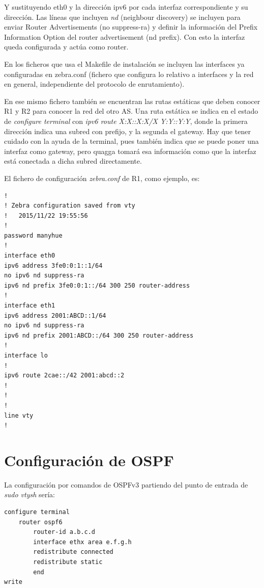 \documentclass{article}
\begin{document}
\hfil

Y sustituyendo eth0 y la dirección ipv6 por cada interfaz correspondiente y su dirección. Las líneas que incluyen \textit{nd} (neighbour discovery) se incluyen para enviar Router Advertisements (no suppress-ra) y definir la información del Prefix Information Option del router advertisement (nd prefix). Con esto la interfaz queda configurada y actúa como router.


En los ficheros que usa el Makefile de instalación se incluyen las interfaces ya configuradas en zebra.conf (fichero que configura lo relativo a interfaces y la red en general, independiente del protocolo de enrutamiento).

En ese mismo fichero también se encuentran las rutas estáticas que deben conocer R1 y R2 para conocer la red del otro AS. Una ruta estática se indica en el estado de \textit{configure terminal} con \textit{ipv6 route X:X::X:X/X  Y:Y::Y:Y}, donde la primera dirección indica una subred con prefijo, y la segunda el gateway. Hay que tener cuidado con la ayuda de la terminal, pues también indica que se puede poner una interfaz como gateway, pero quagga tomará esa información como que la interfaz está conectada a dicha subred directamente.

\hfil

El fichero de configuración \textit{zebra.conf} de R1, como ejemplo, es:

\begin{lstlisting}
!
! Zebra configuration saved from vty
!   2015/11/22 19:55:56
!
password manyhue
!
interface eth0
ipv6 address 3fe0:0:1::1/64
no ipv6 nd suppress-ra
ipv6 nd prefix 3fe0:0:1::/64 300 250 router-address
!
interface eth1
ipv6 address 2001:ABCD::1/64
no ipv6 nd suppress-ra
ipv6 nd prefix 2001:ABCD::/64 300 250 router-address
!
interface lo
!
ipv6 route 2cae::/42 2001:abcd::2
!
!
!
line vty
!
\end{lstlisting}


\section{Configuración de OSPF}

La configuración por comandos de OSPFv3 partiendo del punto de entrada de \textit{sudo vtysh} sería:

\hfil

\begin{BVerbatim}
configure terminal
	router ospf6
		router-id a.b.c.d
		interface ethx area e.f.g.h
		redistribute connected
		redistribute static
		end
write
\end{BVerbatim}
\end{document}
